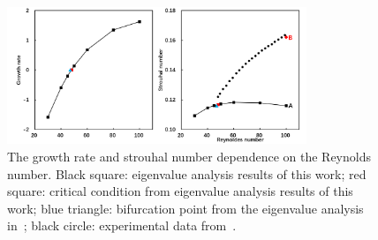 \documentclass[journal,final]{new-aiaa}
\begin{document}
	\begin{figure}[htb]
	\centering   
	\includegraphics[width=0.8\textwidth]{cylinder-stab.png}
	\caption{The growth rate and strouhal number dependence on the
	Reynolds number. Black square: eigenvalue analysis results of
	this work; red square: critical condition from eigenvalue
	analysis results of this work; blue triangle: bifurcation
	point from the eigenvalue analysis in~\cite{Crouch2007Predicting};
	black circle: experimental data from~\cite{C1989Oblique}.}
	\label{fig:cyl-stab}
	\end{figure}
\end{document}
